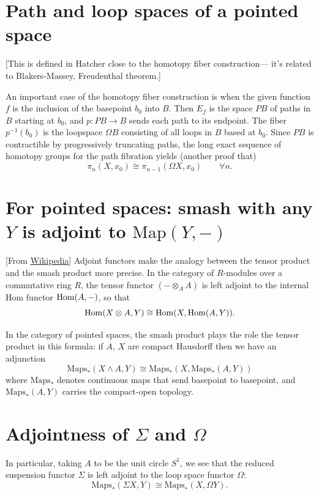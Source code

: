 \section{Path and loop spaces of a pointed
space}
\label{section-path-loop-space-point-space}
[This is defined in Hatcher close to the
homotopy fiber construction--- it's related
to Blakers-Massey, Freudenthal theorem.]

\begin{definition}
\label{definition-path-fibration}
An important case of the homotopy fiber
construction
is when the given function $f$ is the
inclusion of the basepoint $b_0$ into $B$.
Then $E_{f}$ is the space $PB$ of paths in
$B$ starting at $b_{0}$,
and $p:PB\to B$ sends each path to its
endpoint.
The fiber $p^{-1}(b_{0})$ is the loopspace
$\Omega B$
consisting of all loops in  $B$ based at
$b_{0}$.
Since $PB$ is contractible by progressively
truncating paths,
the long exact sequence of homotopy groups
for the path
fibration yields (another proof that)
$$
\pi_{n}(X,x_{0})\cong \pi_{n-1}(\Omega
X,x_{0})\qquad \forall n.
$$
\end{definition}

\section{For pointed spaces: smash with any
\texorpdfstring{$Y$}{Y}
is adjoint to
\texorpdfstring{$\text{Map}(Y,-)$}{Map(Y,-)}}
\label{section-point-space-smash-any-y}

[From
\href{https://en.wikipedia.org/wiki/%
Smash_product#}{Wikipedia}]
Adjoint functors make the analogy between the
tensor product
and the smash product more
precise. In the category of $R$-modules over
a commutative ring $R$, the tensor
functor $(-\otimes_{A} A)$ is left adjoint to
the internal Hom functor
$\mathop{\mathrm{Hom}}\nolimits(A,-)$, so that
$$
\mathop{\mathrm{Hom}}\nolimits(X\otimes A,Y)\cong\mathop{\mathrm{Hom}}\nolimits(X,\mathop{\mathrm{Hom}}\nolimits(A,Y)).
$$

In the category of pointed spaces, the smash
product plays the role the tensor product in
this formula: if $A$, $X$ are compact
Hausdorff then we have an adjunction
$$\text{Maps}_{*}(X\wedge A,Y)\cong
\text{Maps}_{*}(X,\text{Maps}_{*}(A,Y))$$
where $\text{Maps}_{*}$ denotes continuous
maps that send basepoint to basepoint, and
$\text{Maps}_{*}(A,Y)$ carries the
compact-open topology.

\section{Adjointness of
\texorpdfstring{$\Sigma$}{Σ} and
\texorpdfstring{$\Omega$}{Ω}}
\label{section-adjointness-of-and}
In particular, taking $A$ to be the unit
circle $S^{1}$, we see that the reduced
suspension functor $\Sigma$ is left adjoint
to the loop space functor $\Omega$:
$$\text{Maps}_{*}(\Sigma X,Y)\cong
\text{Maps}_{*}(X,\Omega Y).$$


